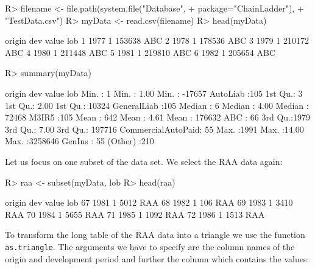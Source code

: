 \documentclass{article}
\begin{document}
\begin{Schunk}
\begin{Sinput}
R> filename <-  file.path(system.file("Database", 
+                                    package="ChainLadder"), 
+                        "TestData.csv")
R> myData <- read.csv(filename)
R> head(myData)
\end{Sinput}
\begin{Soutput}
  origin dev  value lob
1   1977   1 153638 ABC
2   1978   1 178536 ABC
3   1979   1 210172 ABC
4   1980   1 211448 ABC
5   1981   1 219810 ABC
6   1982   1 205654 ABC
\end{Soutput}
\begin{Sinput}
R> summary(myData)
\end{Sinput}
\begin{Soutput}
     origin          dev            value                         lob     
 Min.   :   1   Min.   : 1.00   Min.   : -17657   AutoLiab          :105  
 1st Qu.:   3   1st Qu.: 2.00   1st Qu.:  10324   GeneralLiab       :105  
 Median :   6   Median : 4.00   Median :  72468   M3IR5             :105  
 Mean   : 642   Mean   : 4.61   Mean   : 176632   ABC               : 66  
 3rd Qu.:1979   3rd Qu.: 7.00   3rd Qu.: 197716   CommercialAutoPaid: 55  
 Max.   :1991   Max.   :14.00   Max.   :3258646   GenIns            : 55  
                                                  (Other)           :210  
\end{Soutput}
\end{Schunk}
Let us focus on one subset of the data set. We select the RAA data again:
\begin{Schunk}
\begin{Sinput}
R> raa <- subset(myData, lob %
R> head(raa)
\end{Sinput}
\begin{Soutput}
   origin dev value lob
67   1981   1  5012 RAA
68   1982   1   106 RAA
69   1983   1  3410 RAA
70   1984   1  5655 RAA
71   1985   1  1092 RAA
72   1986   1  1513 RAA
\end{Soutput}
\end{Schunk}
To transform the long table of the RAA data into a triangle we use the
function \texttt{as.triangle}. The arguments we have to specify are
the column names of the origin and development period and further the
column which contains the values:
\end{document}
